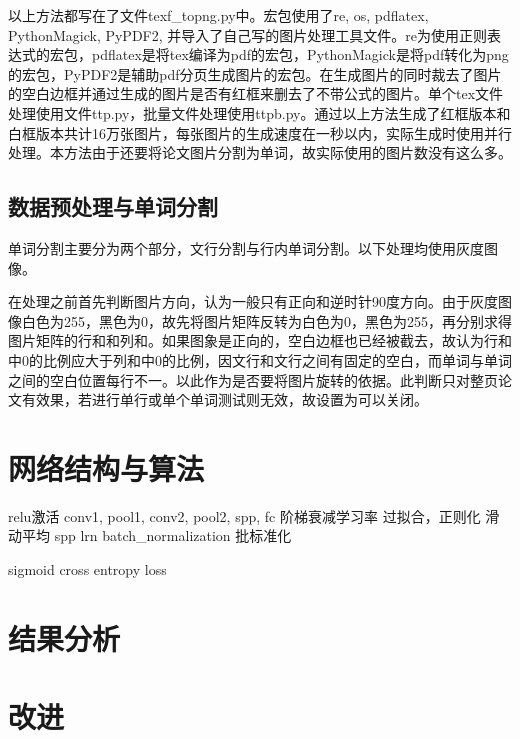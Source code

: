\documentclass[12pt]{article}
\begin{document}
以上方法都写在了文件texf\_topng.py中。宏包使用了re, os, pdflatex, PythonMagick, PyPDF2, 并导入了自己写的图片处理工具文件。re为使用正则表达式的宏包，pdflatex是将tex编译为pdf的宏包，PythonMagick是将pdf转化为png的宏包，PyPDF2是辅助pdf分页生成图片的宏包。在生成图片的同时裁去了图片的空白边框并通过生成的图片是否有红框来删去了不带公式的图片。单个tex文件处理使用文件ttp.py，批量文件处理使用ttpb.py。通过以上方法生成了红框版本和白框版本共计16万张图片，每张图片的生成速度在一秒以内，实际生成时使用并行处理。本方法由于还要将论文图片分割为单词，故实际使用的图片数没有这么多。

\subsection{数据预处理与单词分割}
\noindent

单词分割主要分为两个部分，文行分割与行内单词分割。以下处理均使用灰度图像。

在处理之前首先判断图片方向，认为一般只有正向和逆时针90度方向。由于灰度图像白色为255，黑色为0，故先将图片矩阵反转为白色为0，黑色为255，再分别求得图片矩阵的行和和列和。如果图象是正向的，空白边框也已经被截去，故认为行和中0的比例应大于列和中0的比例，因文行和文行之间有固定的空白，而单词与单词之间的空白位置每行不一。以此作为是否要将图片旋转的依据。此判断只对整页论文有效果，若进行单行或单个单词测试则无效，故设置为可以关闭。






\section{网络结构与算法}
\noindent

relu激活
conv1, pool1, conv2, pool2, spp, fc
阶梯衰减学习率
过拟合，正则化
滑动平均
spp
lrn
batch\_normalization 批标准化

sigmoid cross entropy loss

\cite{rcnn}
\cite{spp}
\cite{frcnn}
\cite{ftrcnn}
\cite{mrcnn}
\cite{yolo}
\cite{ssd}
\cite{ctpn}

\section{结果分析}

\section{改进}




\end{document}
